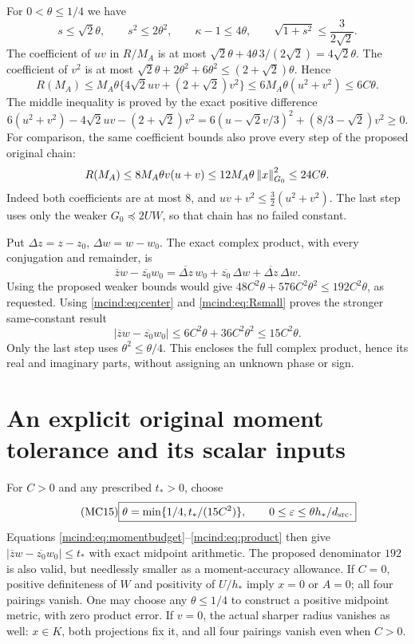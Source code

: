 For $0<\theta\le1/4$ we have
\[
 s\le\sqrt2\theta,\qquad s^2\le2\theta^2,\qquad
 \kappa-1\le4\theta,\qquad
 \sqrt{1+s^2}\le\frac3{2\sqrt2}.
\]
The coefficient of $uv$ in $R/M_A$ is at most
$\sqrt2\theta+4\theta\,3/(2\sqrt2)=4\sqrt2\theta$.
The coefficient of $v^2$ is at most
$\sqrt2\theta+2\theta^2+6\theta^2
\le(2+\sqrt2)\theta$. Hence
\begin{equation}\tag{MC13}\label{mcind:eq:Rsmall}
 R(M_A)\le M_A\theta\{4\sqrt2uv+(2+\sqrt2)v^2\}
          \le6M_A\theta(u^2+v^2)\le6C\theta.
\end{equation}
The middle inequality is proved by the exact positive difference
\[
 6(u^2+v^2)-4\sqrt2uv-(2+\sqrt2)v^2
 =6(u-\sqrt2v/3)^2+(8/3-\sqrt2)v^2\ge0.
\]
For comparison, the same coefficient bounds also prove every
step of the proposed original chain:
\[
 R(M_A)\le8M_A\theta v(u+v)
 \le12M_A\theta\left\lVert x\right\rVert_{G_0}^2\le24C\theta.
\]
Indeed both coefficients are at most $8$, and
$uv+v^2\le\tfrac32(u^2+v^2)$. The last step uses only the
weaker $G_0\preceq2UW$, so that chain has no failed constant.

Put $\Delta z=z-z_0$, $\Delta w=w-w_0$. The exact complex
product, with every conjugation and remainder, is
\[
 \overline z w-\overline{z_0}w_0
  =\overline{\Delta z}\,w_0+\overline{z_0}\,\Delta w
                          +\overline{\Delta z}\,\Delta w.
\]
Using the proposed weaker bounds would give
$48C^2\theta+576C^2\theta^2\le192C^2\theta$, as requested.
Using \eqref{mcind:eq:center} and \eqref{mcind:eq:Rsmall} proves the stronger
same-constant result
\begin{equation}\tag{MC14}\label{mcind:eq:product}
 \boxed{|\overline z w-\overline{z_0}w_0|
       \le6C^2\theta+36C^2\theta^2\le15C^2\theta.}
\end{equation}
Only the last step uses $\theta^2\le\theta/4$. This encloses
the full complex product, hence its real and imaginary parts,
without assigning an unknown phase or sign.

\section{An explicit original moment tolerance and its scalar inputs}

For $C>0$ and any prescribed $t_*>0$, choose
\begin{equation}\tag{MC15}\label{mcind:eq:final}
 \boxed{\theta=\min\{1/4,t_*/(15C^2)\},\qquad
 0\le\varepsilon\le\theta h_*/d_{\rm src}.}
\end{equation}
Equations \eqref{mcind:eq:momentbudget}--\eqref{mcind:eq:product} then give
$|\overline z w-\overline{z_0}w_0|\le t_*$ with exact midpoint
arithmetic. The proposed denominator $192$ is also valid, but
needlessly smaller as a moment-accuracy allowance. If $C=0$,
positive definiteness of $W$ and positivity of $U/h_*$ imply
$x=0$ or $A=0$; all four pairings vanish. One may choose any
$\theta\le1/4$ to construct a positive midpoint metric, with
zero product error. If $v=0$, the actual sharper radius vanishes
as well: $x\in K$, both projections fix it, and all four pairings
vanish even when $C>0$.

